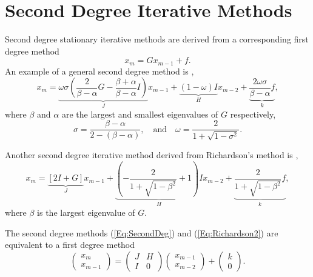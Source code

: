\documentclass{article}
\begin{document}
\section{Second Degree Iterative Methods}

Second degree stationary iterative methods are derived from a corresponding first degree method
\begin{equation*}
  x_m = Gx_{m-1} + f.
\end{equation*}
An example of a general second degree method is \cite[Equation (2.9)]{Young72},
\begin{equation}
  \label{Eq:SecondDeg}
  x_m = \underbrace{\omega\sigma\left(\frac{2}{\beta-\alpha}G - \frac{\beta+\alpha}{\beta-\alpha} I \right)}_J x_{m-1} + \underbrace{(1-\omega) I}_H x_{m-2} + \underbrace{\frac{2\omega\sigma}{\beta-\alpha} f}_k,
\end{equation}
where $\beta$ and $\alpha$ are the largest and smallest eigenvalues of $G$ respectively,
\begin{equation*}
\sigma = \frac{\beta - \alpha}{2 - (\beta - \alpha)}, \quad \text{and} \quad \omega = \frac{2}{1+\sqrt{1-\sigma^2}}.
\end{equation*}

Another second degree iterative method derived from Richardson's method is \cite[Section 2]{GV61},
\begin{equation}
  \label{Eq:Richardson2}
  x_m = \underbrace{\left[2 I + G\right]}_{J}x_{m-1} + \underbrace{\left(-\frac{2}{1+\sqrt{1-\beta^2}}+1\right)I}_{H}x_{m-2} + \underbrace{\frac{2}{1+\sqrt{1-\beta^2}} f}_k,
\end{equation}
where $\beta$ is the largest eigenvalue of $G$.

The second degree methods (\ref{Eq:SecondDeg}) and (\ref{Eq:Richardson2}) are equivalent to a first degree method
\begin{equation*}
  \begin{pmatrix}
    x_m \\
    x_{m-1}
  \end{pmatrix}
  =
  \begin{pmatrix}
    J & H \\
    I & 0 
  \end{pmatrix}
  \begin{pmatrix}
    x_{m-1}\\
    x_{m-2}
  \end{pmatrix}
  +
  \begin{pmatrix}
    k \\
    0
  \end{pmatrix}
  .
\end{equation*}
\end{document}
